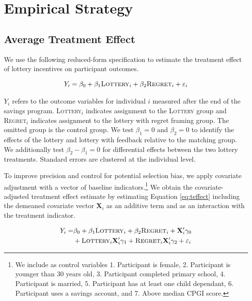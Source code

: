 \documentclass[12pt]{article}
\begin{document}
\section{Empirical Strategy} \label{sec:est}

	\subsection{Average Treatment Effect}

		We use the following reduced-form specification to estimate the treatment effect of lottery incentives on participant outcomes.

		\begin{equation} \label{eq:teffect}
			Y_{i} = \beta_{0} + \beta_{1}\text{\textsc{Lottery}}_{i} + \beta_{2}\text{\textsc{Regret}}_{i} + \varepsilon_{i}
		\end{equation}

		$Y_{i}$ refers to the outcome variables for individual $i$ measured after the end of the savings program. \textsc{Lottery}$_i$ indicates assignment to the \textsc{Lottery} group and \textsc{Regret}$_i$ indicates assignment to the lottery with regret framing group. The omitted group is the control group. We test $\beta_{1} = 0$ and $\beta_{2} = 0$ to identify the effects of the lottery and lottery with feedback relative to the matching group. We additionally test $\beta_{2} - \beta_{1} = 0$ for differential effects between the two lottery treatments. Standard errors are clustered at the individual level.

		To improve precision and control for potential selection bias, we apply covariate adjustment with a vector of baseline indicators.\footnote{We include as control variables 1. Participant is female, 2. Participant is younger than 30 years old, 3. Participant completed primary school, 4. Participant is married, 5. Participant has at least one child dependant, 6. Participant uses a savings account, and 7. Above median CPGI score.} We obtain the covariate-adjusted treatment effect estimate by estimating Equation \ref{eq:teffect} including the demeaned covariate vector $\mathbf{X}_{i}$ as an additive term and as an interaction with the treatment indicator.

		\begin{equation} \begin{split} \label{eq:controls}
			Y_{i} = & \beta_{0} + \beta_{1}\text{\textsc{Lottery}}_{i} + \beta_{2}\text{\textsc{Regret}}_{i} + \mathbf{X}'_i \gamma_{0} \\
					& + \text{\textsc{Lottery}}_{i} \mathbf{X}'_i \gamma_{1} + \text{\textsc{Regret}}_{i} \mathbf{X}'_i \gamma_{2} + \varepsilon_{i}
		\end{split} \end{equation}
\end{document}

